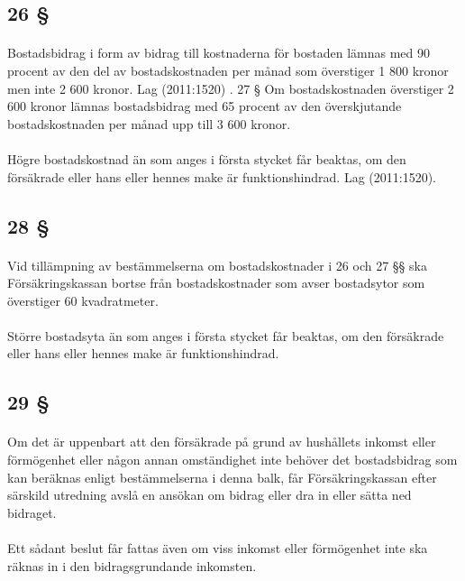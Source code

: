 \documentclass[a4paper,notitlepage,openany,10pt]{book}
\begin{document}
\subsection*{26 §}
\paragraph*{}
Bostadsbidrag i form av bidrag till kostnaderna för bostaden lämnas med 90 procent av den del av bostadskostnaden per månad som överstiger 1 800 kronor men inte 2 600 kronor.
Lag (2011:1520)
. 27 § Om bostadskostnaden överstiger 2 600 kronor lämnas bostadsbidrag med 65 procent av den överskjutande bostadskostnaden per månad upp till 3 600 kronor.
\paragraph*{}
Högre bostadskostnad än som anges i första stycket får beaktas, om den försäkrade eller hans eller hennes make är funktionshindrad.
Lag (2011:1520).
\subsection*{28 §}
\paragraph*{}
Vid tillämpning av bestämmelserna om bostadskostnader i 26 och 27 §§ ska Försäkringskassan bortse från bostadskostnader som avser bostadsytor som överstiger 60 kvadratmeter.
\paragraph*{}
Större bostadsyta än som anges i första stycket får beaktas, om den försäkrade eller hans eller hennes make är funktionshindrad.
\subsection*{29 §}
\paragraph*{}
Om det är uppenbart att den försäkrade på grund av hushållets inkomst eller förmögenhet eller någon annan omständighet inte behöver det bostadsbidrag som kan beräknas enligt bestämmelserna i denna balk, får Försäkringskassan efter särskild utredning avslå en ansökan om bidrag eller dra in eller sätta ned bidraget.
\paragraph*{}
Ett sådant beslut får fattas även om viss inkomst eller förmögenhet inte ska räknas in i den bidragsgrundande inkomsten.
\end{document}

